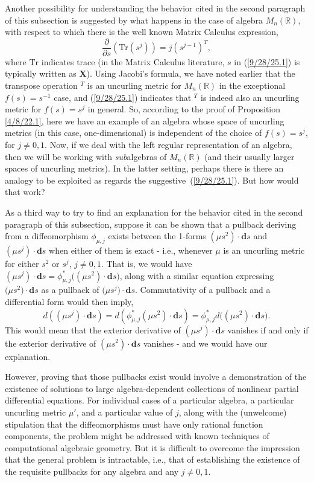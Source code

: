 \documentclass{amsart}
\theoremstyle{definition}
\numberwithin{theorem}{section}
\numberwithin{equation}{section}
\begin{document}
Another possibility for understanding the behavior cited in the second paragraph of this subsection is suggested by what happens in the case of algebra $M_n(\mathbb{R})$, with respect to which there is the well known Matrix Calculus expression, \begin{equation}\label{9/28/25.1} \frac{\partial}{\partial s}\left(\text{Tr}(s^j)\right) = j\left(s^{j-1}\right)^T,\end{equation} where $\text{Tr}$ indicates trace (in the Matrix Calculus literature, $s$ in (\ref{9/28/25.1}) is typically written as $\mathbf{X}$). Using Jacobi's formula, we have noted earlier that the transpose operation $^T$ is an uncurling metric for $M_n(\mathbb{R})$ in the exceptional $f(s)=s^{-1}$ case, and (\ref{9/28/25.1}) indicates that $^T$ is indeed also an uncurling metric for $f(s)=s^j$ in general.  So, according to the proof of Proposition \ref{4/8/22.1}, here we have an example of an algebra whose space of uncurling metrics (in this case, one-dimensional) is independent of the choice of $f(s)=s^j$, for $j\ne 0,1$. Now, if we deal with the left regular representation of an algebra, then we will be working with {\it sub}algebras of $M_n(\mathbb{R})$ (and their usually larger spaces of uncurling metrics).  In the latter setting, perhaps there is there an analogy to be exploited as regards the \mbox{suggestive (\ref{9/28/25.1})}.  But how would that work?  

As a third way to try to find an explanation for the behavior cited in the second paragraph of this subsection, suppose it can be shown that a pullback deriving from a diffeomorphism $\phi_{\mu,j}$ exists between the 1-forms $(\mu s^2)\cdot \mathbf{d}s$ and $(\mu s^j)\cdot \mathbf{d}s$ when either of them is exact - i.e., whenever $\mu$ is an uncurling metric for either $s^2$ or $s^j$, $j\ne 0,1$.   That is, we would have $(\mu s^j)\cdot \mathbf{d}s = \phi_{\mu,j}^* \big((\mu s^2)\cdot \mathbf{d}s\big)$, along with a similar equation expressing $\big(\mu s^2\big)\cdot \mathbf{d}s$ as a pullback of $\big(\mu s^j\big)\cdot \mathbf{d}s$.  Commutativity of a pullback and a differential form  would then imply, \[ d\left((\mu s^j)\cdot \mathbf{d}s \right)= d\left(\phi_{\mu,j}^* (\mu s^2)\cdot \mathbf{d}s\right) = \phi_{\mu,j}^*d\big((\mu s^2)\cdot \mathbf{d}s\big).\] This would mean that the exterior derivative of $(\mu s^j)\cdot \mathbf{d}s$ vanishes if and only if the exterior derivative of $(\mu s^2)\cdot \mathbf{d}s$ vanishes - and we would have our explanation.

However, proving that those pullbacks exist would involve a demonstration of the existence of solutions to large algebra-dependent collections of nonlinear partial differential equations.  For individual cases of a particular algebra, a particular uncurling metric $\mu'$, and a particular value of $j$, along with the (unwelcome) stipulation that the diffeomorphisms must have only rational function components, the problem might be addressed with known techniques of computational algebraic geometry.  But it is difficult to overcome the impression that the general problem is intractable, i.e., that of establishing the existence of the requisite pullbacks for any algebra and any $j\ne 0,1$. 
\end{document}

